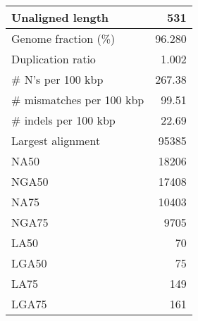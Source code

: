 \documentclass[12pt,a4paper]{article}
\begin{document}
\begin{table}[ht]
\begin{center}
\begin{tabular}{|l*{1}{|r}|}
Unaligned length & 531 \\ \hline
Genome fraction (\%) & 96.280 \\ \hline
Duplication ratio & 1.002 \\ \hline
\# N's per 100 kbp & 267.38 \\ \hline
\# mismatches per 100 kbp & 99.51 \\ \hline
\# indels per 100 kbp & 22.69 \\ \hline
Largest alignment & 95385 \\ \hline
NA50 & 18206 \\ \hline
NGA50 & 17408 \\ \hline
NA75 & 10403 \\ \hline
NGA75 & 9705 \\ \hline
LA50 & 70 \\ \hline
LGA50 & 75 \\ \hline
LA75 & 149 \\ \hline
LGA75 & 161 \\ \hline
\end{tabular}
\end{center}
\end{table}
\end{document}
